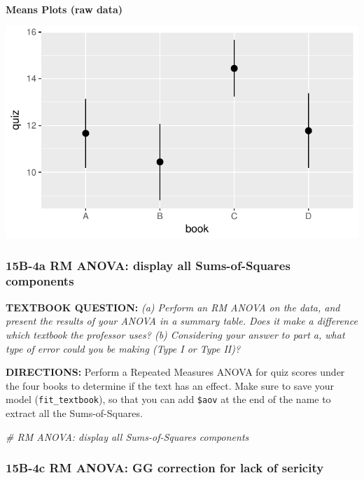 \documentclass[]{article}
\newenvironment{Shaded}{\begin{snugshade}}{\end{snugshade}}
\newcommand{\CommentTok}[1]{\textcolor[rgb]{0.56,0.35,0.01}{\textit{#1}}}
\begin{document}
\textbf{Means Plots (raw data)}

\begin{center}\includegraphics{Unit_5_assignment_SKELETON_R__spr18__files/figure-latex/unnamed-chunk-14-1} \end{center}

\clearpage

\subsubsection{15B-4a RM ANOVA: display all Sums-of-Squares
components}\label{b-4a-rm-anova-display-all-sums-of-squares-components}

\textbf{TEXTBOOK QUESTION:} \emph{(a) Perform an RM ANOVA on the data,
and present the results of your ANOVA in a summary table. Does it make a
difference which textbook the professor uses? (b) Considering your
answer to part a, what type of error could you be making (Type I or Type
II)?}

\textbf{DIRECTIONS:} Perform a Repeated Measures ANOVA for quiz scores
under the four books to determine if the text has an effect. Make sure
to save your model (\texttt{fit\_textbook}), so that you can add
\texttt{\$aov} at the end of the name to extract all the
Sums-of-Squares.

\begin{Shaded}
\begin{Highlighting}[]
\CommentTok{# RM ANOVA: display all Sums-of-Squares components}
\end{Highlighting}
\end{Shaded}

\clearpage

\subsubsection{15B-4c RM ANOVA: GG correction for lack of
sericity}\label{b-4c-rm-anova-gg-correction-for-lack-of-sericity}
\end{document}

